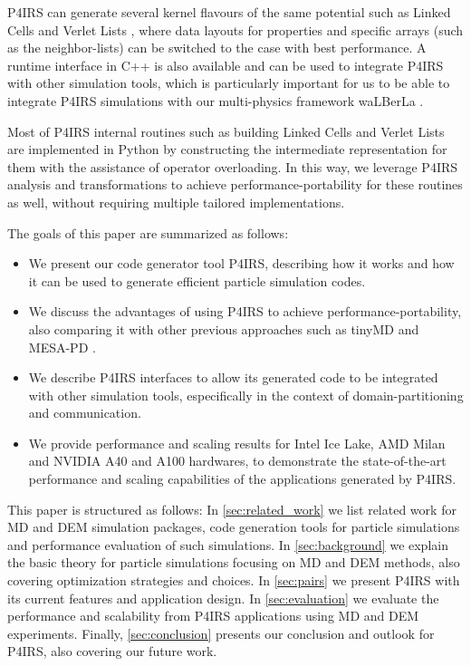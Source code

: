 \documentclass[preprint,12pt]{elsarticle}
\begin{document}
P4IRS can generate several kernel flavours of the same potential such as Linked Cells \cite{linkedcells} and Verlet Lists \cite{verletlists}, where data layouts for properties and specific arrays (such as the neighbor-lists) can be switched to the case with best performance.
A runtime interface in C++ is also available and can be used to integrate P4IRS with other simulation tools, which is particularly important for us to be able to integrate P4IRS simulations with our multi-physics framework waLBerLa \cite{walberla1,walberla2}.

Most of P4IRS internal routines such as building Linked Cells and Verlet Lists are implemented in Python by constructing the intermediate representation for them with the assistance of operator overloading.
In this way, we leverage P4IRS analysis and transformations to achieve performance-portability for these routines as well, without requiring multiple tailored implementations.

The goals of this paper are summarized as follows:
\begin{itemize}
	\item We present our code generator tool P4IRS, describing how it works and how it can be used to generate efficient particle simulation codes.
	\item We discuss the advantages of using P4IRS to achieve performance-portability, also comparing it with other previous approaches such as tinyMD \cite{tinymd} and MESA-PD \cite{mesapd1,mesapd2}.
	\item We describe P4IRS interfaces to allow its generated code to be integrated with other simulation tools, especifically in the context of domain-partitioning and communication.
	\item We provide performance and scaling results for Intel Ice Lake, AMD Milan and NVIDIA A40 and A100 hardwares, to demonstrate the state-of-the-art performance and scaling capabilities of the applications generated by P4IRS.
\end{itemize}

This paper is structured as follows: In \autoref{sec:related_work} we list related work for MD and DEM simulation packages, code generation tools for particle simulations and performance evaluation of such simulations. In \autoref{sec:background} we explain the basic theory for particle simulations focusing on MD and DEM methods, also covering optimization strategies and choices. In \autoref{sec:pairs} we present P4IRS with its current features and application design. In \autoref{sec:evaluation} we evaluate the performance and scalability from P4IRS applications using \ac{MD} and \ac{DEM} experiments. Finally, \autoref{sec:conclusion} presents our conclusion and outlook for P4IRS, also covering our future work.
\end{document}
